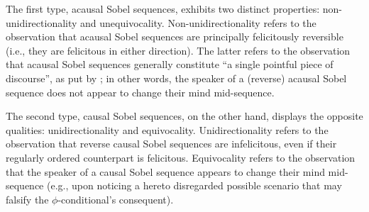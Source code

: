 The first type, acausal Sobel sequences, exhibits two distinct properties: non-unidirectionality and unequivocality. Non-unidirectionality refers to the observation that acausal Sobel sequences are principally felicitously reversible (i.e., they are felicitous in either direction). The latter refers to the observation that acausal Sobel sequences generally constitute \enquote{a single pointful piece of discourse}, as put by \textcite{Edgington1995}; in other words, the speaker of a (reverse) acausal Sobel sequence does not appear to change their mind mid-sequence.

The second type, causal Sobel sequences, on the other hand, displays the opposite qualities: unidirectionality and equivocality. Unidirectionality refers to the observation that reverse causal Sobel sequences are infelicitous, even if their regularly ordered counterpart is felicitous. Equivocality refers to the observation that the speaker of a causal Sobel sequence appears to change their mind mid-sequence (e.g., upon noticing a hereto disregarded possible scenario that may falsify the $\phi$-conditional's consequent). 

